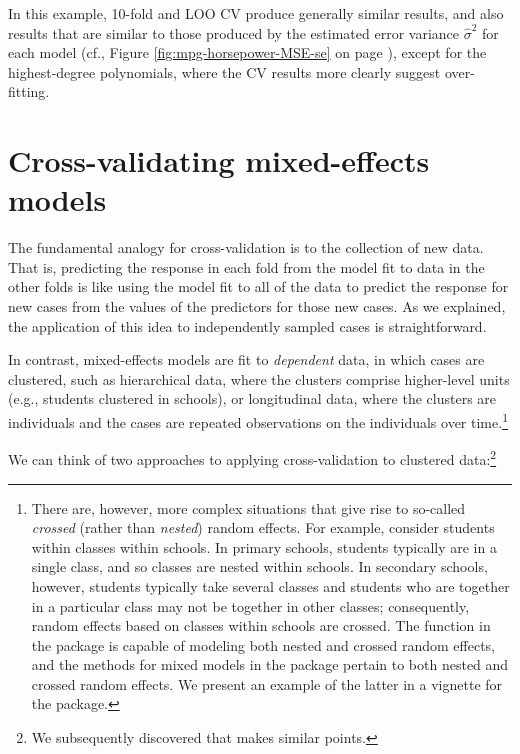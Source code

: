 \documentclass[
]{jss}
\begin{document}
In this example, 10-fold and LOO CV produce generally similar results,
and also results that are similar to those produced by the estimated
error variance \(\widehat{\sigma}^2\) for each model (cf., Figure
\ref{fig:mpg-horsepower-MSE-se} on page
\pageref{fig:mpg-horsepower-MSE-se}), except for the highest-degree
polynomials, where the CV results more clearly suggest over-fitting.

\hypertarget{cross-validating-mixed-effects-models}{%
\section{Cross-validating mixed-effects
models}\label{cross-validating-mixed-effects-models}}

The fundamental analogy for cross-validation is to the collection of new
data. That is, predicting the response in each fold from the model fit
to data in the other folds is like using the model fit to all of the
data to predict the response for new cases from the values of the
predictors for those new cases. As we explained, the application of this
idea to independently sampled cases is straightforward.

In contrast, mixed-effects models are fit to \emph{dependent} data, in
which cases are clustered, such as hierarchical data, where the clusters
comprise higher-level units (e.g., students clustered in schools), or
longitudinal data, where the clusters are individuals and the cases are
repeated observations on the individuals over time.\footnote{There are,
  however, more complex situations that give rise to so-called
  \emph{crossed} (rather than \emph{nested}) random effects. For
  example, consider students within classes within schools. In primary
  schools, students typically are in a single class, and so classes are
  nested within schools. In secondary schools, however, students
  typically take several classes and students who are together in a
  particular class may not be together in other classes; consequently,
  random effects based on classes within schools are crossed. The
   function in the  package is capable of
  modeling both nested and crossed random effects, and the 
  methods for mixed models in the  package pertain to both
  nested and crossed random effects. We present an example of the latter
  in a vignette for the  package.}

We can think of two approaches to applying cross-validation to clustered
data:\footnote{We subsequently discovered that \citet[Section
  8]{Vehtari:2023} makes similar points.}
\end{document}
